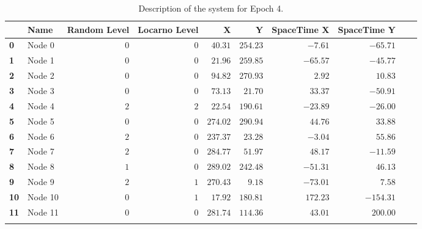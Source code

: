 \documentclass[a4paper,11pt,twoside=semi,openright]{report}
\begin{document}
\begin{table}[h]
\centering
\tiny
\begin{tabular}{@{}llrrrrrrll@{}}
\toprule
& \textbf{Name}   &\textbf{Random Level} &\textbf{Locarno Level} & \textbf{X} & \textbf{Y} & \textbf{SpaceTime X} & \textbf{SpaceTime Y}  \\ \midrule
\textbf{0} & Node 0&$0$&$0$&$40.31$&$254.23$&$-7.61$&$-65.71$&\\ \hdashline
\textbf{1} & Node 1&$0$&$0$&$21.96$&$259.85$&$-65.57$&$-45.77$&\\ \hdashline
\textbf{2} & Node 2&$0$&$0$&$94.82$&$270.93$&$2.92$&$10.83$&\\ \hdashline
\textbf{3} & Node 3&$0$&$0$&$73.13$&$21.70$&$33.37$&$-50.91$&\\ \hdashline
\textbf{4} & Node 4&$2$&$2$&$22.54$&$190.61$&$-23.89$&$-26.00$&\\ \hdashline
\textbf{5} & Node 5&$0$&$0$&$274.02$&$290.94$&$44.76$&$33.88$&\\ \hdashline
\textbf{6} & Node 6&$2$&$0$&$237.37$&$23.28$&$-3.04$&$55.86$&\\ \hdashline
\textbf{7} & Node 7&$2$&$0$&$284.77$&$51.97$&$48.17$&$-11.59$&\\ \hdashline
\textbf{8} & Node 8&$1$&$0$&$289.02$&$242.48$&$-51.31$&$46.13$&\\ \hdashline
\textbf{9} & Node 9&$2$&$1$&$270.43$&$9.18$&$-73.01$&$7.58$&\\ \hdashline
\textbf{10} & Node 10&$0$&$1$&$17.92$&$180.81$&$172.23$&$-154.31$&\\ \hdashline
\textbf{11} & Node 11&$0$&$0$&$281.74$&$114.36$&$43.01$&$200.00$&\\ \hdashline\midrule
\bottomrule
\end{tabular}
\caption{Description of the system for Epoch 4.}
\end{table}
\end{document}

